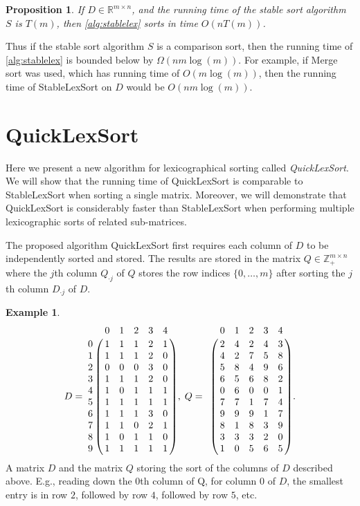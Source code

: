 \documentclass[a4paper,10pt,reqno]{amsart}
\newcommand\Z{\mathbb Z}
\newcommand\R{\mathbb R}
\newtheorem{proposition}{Proposition}
\theoremstyle{definition}
\newtheorem{example}{Example}
\begin{document}
\begin{proposition}
If $D \in \R^{m \times n}$, and the running time of the stable sort algorithm
$S$ is $T(m)$, then \autoref{alg:stablelex} sorts in time $O(nT(m))$.
\end{proposition}

Thus if the stable sort algorithm $S$ is a comparison sort, then the running
time of \autoref{alg:stablelex} is bounded below by $\Omega(nm\log(m))$.
For example, if Merge sort \cite{Knuth:1998fk} was used, which has running time
of $O(m\log(m))$, then the running time of StableLexSort on $D$ would be
$O(nm\log(m))$.

\section{QuickLexSort}
\label{sec:qls}
Here we present a new algorithm for lexicographical sorting called
\emph{QuickLexSort}.  We will show that the running time of QuickLexSort is
comparable to StableLexSort when sorting a single matrix. Moreover, we will
demonstrate that QuickLexSort is considerably faster than StableLexSort when
performing multiple lexicographic sorts of related sub-matrices.

The proposed algorithm QuickLexSort first requires each column of $D$ to be
independently sorted and stored. The results are stored in the matrix $Q \in \Z_+^{m \times
n}$ where the $j$th column $Q_{\cdot j}$ of $Q$ stores the row indices
$\{0,\ldots,m\}$ after sorting the $j$th column $D_{\cdot j}$ of $D$.  


\begin{example}
$$D = 
\bordermatrix{
  & 0 & 1 & 2 & 3 & 4 \cr
0 & 1 & 1 & 1 & 2 & 1 \cr
1 & 1 & 1 & 1 & 2 & 0 \cr
2 & 0 & 0 & 0 & 3 & 0 \cr
3 & 1 & 1 & 1 & 2 & 0 \cr
4 & 1 & 0 & 1 & 1 & 1 \cr
5 & 1 & 1 & 1 & 1 & 1 \cr
6 & 1 & 1 & 1 & 3 & 0 \cr
7 & 1 & 1 & 0 & 2 & 1 \cr
8 & 1 & 0 & 1 & 1 & 0 \cr
9 & 1 & 1 & 1 & 1 & 1 }, \;
Q = 
\bordermatrix{
  & 0 & 1 & 2 & 3 & 4 \cr
  & 2 & 4 & 2 & 4 & 3 \cr
  & 4 & 2 & 7 & 5 & 8 \cr
  & 5 & 8 & 4 & 9 & 6 \cr
  & 6 & 5 & 6 & 8 & 2 \cr
  & 0 & 6 & 0 & 0 & 1 \cr
  & 7 & 7 & 1 & 7 & 4 \cr
  & 9 & 9 & 9 & 1 & 7 \cr
  & 8 & 1 & 8 & 3 & 9 \cr
  & 3 & 3 & 3 & 2 & 0 \cr
  & 1 & 0 & 5 & 6 & 5}. $$
A matrix $D$ and the matrix $Q$ storing the sort of the columns of $D$
described above. E.g., reading down the $0$th column of Q, for column $0$ of $D$, the smallest
entry is in row $2$, followed by row $4$, followed by row $5$, etc.
\end{example}
\end{document}
